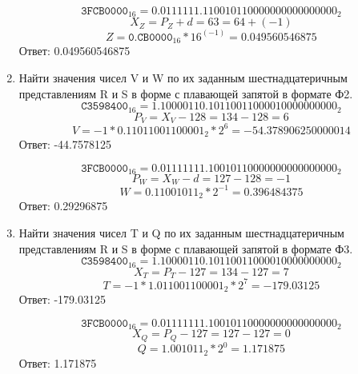 \documentclass{article}
\begin{document}
\begin{enumerate}
            $$ 
                  \texttt{3FCB0000}_{16} =
                  0.0111111.110010110000000000000000_2
            $$
            $$ X_Z = P_Z + d = 63 = 64 + (-1) $$
            $$ Z = \texttt{0.CB0000}_{16} * 16^{(-1)} = 0.049560546875 $$
            Ответ: 0.049560546875
      \item Найти значения чисел V и W по их заданным шестнадцатеричным представлениям R и S в форме с плавающей запятой в формате Ф2.
            $$ 
                  \texttt{C3598400}_{16} =
                  1.10000110.10110011000010000000000_2
            $$
            $$ P_V = X_V - 128 = 134 - 128 = 6 $$
            $$ V = -1 * 0.11011001100001_{2} * 2^6 = -54.378906250000014 $$
            Ответ: -44.7578125
            
            $$ 
                  \texttt{3FCB0000}_{16} =
                  0.01111111.10010110000000000000000_2
            $$
            $$ P_W = X_W - d = 127 - 128 = -1 $$
            $$ W = 0.11001011_{2} * 2^{-1} = 0.396484375 $$
            Ответ: 0.29296875
      \item Найти значения чисел T и Q по их заданным шестнадцатеричным представлениям R и S в форме с плавающей запятой в формате Ф3.
            $$ 
                  \texttt{C3598400}_{16} =
                  1.10000110.10110011000010000000000_2
            $$
            $$ X_T = P_T - 127 = 134 - 127 = 7 $$
            $$ T = -1 * 1.011001100001_{2} * 2^7 = -179.03125 $$
            Ответ: -179.03125
            
            $$ 
                  \texttt{3FCB0000}_{16} =
                  0.01111111.10010110000000000000000_2
            $$
            $$ X_Q = P_Q - 127 = 127 - 127 = 0 $$
            $$ Q = 1.001011_{2} * 2^0 = 1.171875 $$
            Ответ: 1.171875
\end{enumerate}
\end{document}
